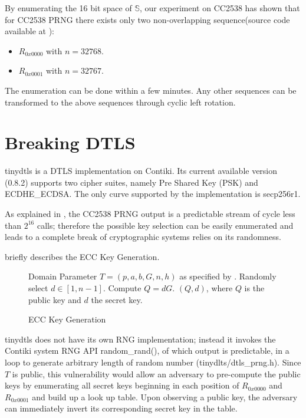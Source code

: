 By enumerating the 16 bit space of $\mathbb{S}$, our experiment on CC2538 has shown that for CC2538 PRNG there exists only two non-overlapping sequence(source code available at \cite{prngtest}):
\begin{itemize}
	\item $R_{0x0000}$ with $n = 32768$.
	\item $R_{0x0001}$ with $n = 32767$.
\end{itemize}
The enumeration can be done within a few minutes. Any other sequences can be transformed to the above sequences through cyclic left rotation. 

\section{Breaking DTLS} \label{BreakDTLS}
tinydtls\cite{tinydtls} is a DTLS implementation on Contiki. Its current available version\cite{tinydtls082} (0.8.2) supports two cipher suites, namely Pre Shared Key (PSK) and ECDHE\_ECDSA\cite{rfc4492}. The only curve supported by the implementation is secp256r1\cite{secp256r1}.

As explained in , the CC2538 PRNG output is a predictable stream of cycle less than $2^{16}$ calls; therefore the possible key selection can be easily enumerated and leads to a complete break of cryptographic systems relies on its randomness.    

 briefly describes the ECC Key Generation.
\begin{figure}
	\begin{algorithmic}[1]
	\REQUIRE Domain Parameter $T = (p, a, b, G, n, h)$ as specified by \cite{secp256r1}.
	\STATE Randomly select $d \in [1, n-1]$.
	\STATE Compute $Q = dG$.
	\RETURN $(Q,d)$, where $Q$ is the public key and $d$ the secret key.
	\end{algorithmic}
	\caption{ECC Key Generation}
	\label{KeyGen}
\end{figure}

tinydtls does not have its own RNG implementation; instead it invokes the Contiki system RNG API random\_rand(), of which output is predictable, in a loop to generate arbitrary length of random number (tinydlts/dtls\_prng.h). Since $T$ is public, this vulnerability would allow an adversary to pre-compute the public keys by enumerating all secret keys beginning in each position of $R_{0x0000}$ and $R_{0x0001}$ and build up a look up table. Upon observing a public key, the adversary can immediately invert its corresponding secret key in the table.


